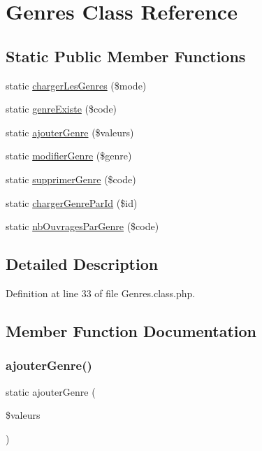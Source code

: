 \hypertarget{class_genres}{}\section{Genres Class Reference}
\label{class_genres}
\subsection*{Static Public Member Functions}
\begin{DoxyCompactItemize}
\item 
static \hyperlink{class_genres_a089e493cd2c6ff93bc14f25b403781ba}{charger\+Les\+Genres} (\$mode)
\item 
static \hyperlink{class_genres_a22eb0e6b9010a8ca053bded96a59413a}{genre\+Existe} (\$code)
\item 
static \hyperlink{class_genres_a1ec684b57efee122d1362d505c75c61d}{ajouter\+Genre} (\$valeurs)
\item 
static \hyperlink{class_genres_a303e349fc6a371e321aaf9d49b47a825}{modifier\+Genre} (\$genre)
\item 
static \hyperlink{class_genres_a62be7460d8b307efca163e2b5ca79da3}{supprimer\+Genre} (\$code)
\item 
static \hyperlink{class_genres_add6e7378b07238ff72b2757add7e3003}{charger\+Genre\+Par\+Id} (\$id)
\item 
static \hyperlink{class_genres_a15c7d28c326ff43eaa69cfccf26ce061}{nb\+Ouvrages\+Par\+Genre} (\$code)
\end{DoxyCompactItemize}


\subsection{Detailed Description}


Definition at line 33 of file Genres.\+class.\+php.



\subsection{Member Function Documentation}
\mbox{\label{class_genres_a1ec684b57efee122d1362d505c75c61d}} 
\subsubsection{\texorpdfstring{ajouter\+Genre()}{ajouterGenre()}}
{\footnotesize\ttfamily static ajouter\+Genre (\begin{DoxyParamCaption}\item[{}]{\$valeurs }\end{DoxyParamCaption})\hspace{0.3cm}{\ttfamily [static]}}



